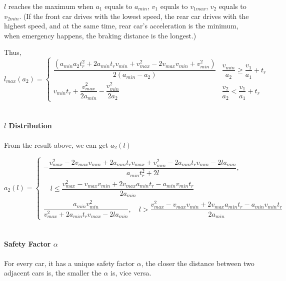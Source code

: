 $l$ reaches the maximum when $a_1$ equals to $a_{min}$, { }$v_1$ 
equals to $v_{1max}$, $v_2$ equals to $v_{2min}$. (If the front 
car drives with the lowest speed, the rear car drives with the 
highest speed, and at the same time, rear car's acceleration is 
the minimum, when emergency happens, the braking distance is 
the longest.)

Thus,
\begin{displaymath}
l_{max}(a_2) = 
\left \{
\begin{array}{cl}
\dfrac{(a_{min}a_2t_r^2 + 2a_{min}t_rv_{min} + v_{max}^2 - 2v_{max}v_{min} + v_{min}^2)}{2(a_{min}-a_2)} & \dfrac{v_{min}}{a_2}  \geq \dfrac{v_1}{a_1} + t_r \\
v_{min} t_r + \dfrac{v_{max} ^ 2}{2a_{min}} -\dfrac{v_{min}^2}{2a_2} & \dfrac{v_2}{a_2}  < \dfrac{v_1}{a_1} + t_r
\end{array}
\right .
\end{displaymath}\\

\paragraph{$l${ } Distribution}
From the result above, we can get $a_2(l)$

\[ a_2(l) = \begin{cases}
-\dfrac{v_{max}^2 - 2v_{max}v_{min} + 2a_{min}t_rv_{max} + v_{min}^2 - 2a_{min}t_rv_{min} - 2la_{min}}{a_{min}t_r^2 + 2l}, 
\\

\quad l \leq \dfrac{v_{max}^2 - v_{max}v_{min} + 2v_{max}a_{min}t_r - a_{min} v_{min}t_r}{2a_{min}}\\
\dfrac{a_{min}v_{min}^2}{v_{max}^2 + 2a_{min}t_rv_{max} - 2la_{min}}, \quad  l > \dfrac{v_{max}^2 - v_{max}v_{min} + 2v_{max}a_{min}t_r - a_{min} v_{min}t_r}{2a_{min}}
\end{cases}\]
\\

\paragraph{Safety Factor $\alpha$}
For every car, it has a unique safety factor $\alpha$, the 
closer the distance between two adjacent cars is, the smaller 
the $\alpha$ is, vice versa.\\

